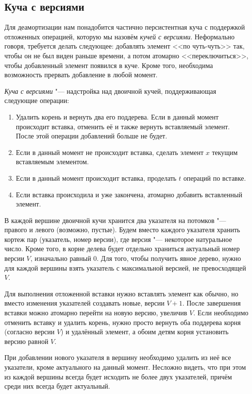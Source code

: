 \subsection{Куча с версиями} \label{heap-with-versions}
Для деамортизации нам понадобится частично персистентная куча с поддержкой
отложенных операцией, которую мы назовём \emph{кучей с версиями}.
Неформально говоря, требуется делать следующее: добавлять элемент <<по чуть-чуть>>
так, чтобы он не был виден раньше времени, а потом атомарно <<переключиться>>,
чтобы добавленный элемент появился в куче. Кроме того, необходима возможность
прервать добавление в любой момент.

\begin{definition}
\emph{Куча с версиями} "--- надстройка над двоичной кучей,
поддерживающая следующие операции:
\begin{enumerate}
\item Удалить корень и вернуть два его поддерева. Если в данный момент происходит
    вставка, отменить её и также вернуть вставляемый элемент. После этой операции
    добавлений больше не будет.
\item Если в данный момент не происходит вставка, сделать элемент $x$
    текущим вставляемым элементом.
\item Если в данный момент происходит вставка, проделать $t$ операций по вставке.
\item Если вставка происходила и уже закончена, атомарно добавить вставленный элемент.
\end{enumerate}
\end{definition}

В каждой вершине двоичной кучи хранится два указателя на потомков "--- правого
и левого (возможно, пустые). Будем вместо каждого указателя хранить кортеж
пар (указатель, номер версии), где версия "--- некоторое натуральное число.
Кроме того, в корне делева будет отдельно храниться актуальный номер версии $V$,
изначально равный $0$.
Для того, чтобы получить явное дерево, нужно для каждой вершины взять
указатель с максимальной версией, не превосходящей $V$.

Для выполнения отложенной вставки нужно вставлять элемент как обычно, но вместо
изменения указателей создавать новые, версии $V+1$. После завершения вставки
можно атомарно перейти на новую версию, увеличив $V$. Если необходимо отменить
вставку и удалить корень, нужно просто вернуть оба поддерева корня (согласно версии
$V$) и удалённый элемент, а обоим детям корня установить версию равной $V$.

При добавлении нового указателя в вершину необходимо удалить из неё все указатели,
кроме актуального на данный момент. Несложно видеть, что при этом из каждой
вершины всегда будет исходить не более двух указателей, причём среди них
всегда будет актуальный.
